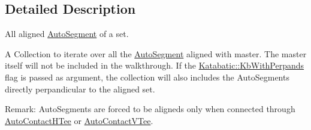 \subsection{Detailed Description}
All aligned \hyperlink{classKatabatic_1_1AutoSegment}{Auto\-Segment} of a set. 

A Collection to iterate over all the \hyperlink{classKatabatic_1_1AutoSegment}{Auto\-Segment} aligned with {\ttfamily master}. The {\ttfamily master} itself will not be included in the walkthrough. If the \hyperlink{namespaceKatabatic_a2af2ad6b6441614038caf59d04b3b217ae2d033c8f78b61468c827de8db5fe839}{Katabatic\-::\-Kb\-With\-Perpands} flag is passed as argument, the collection will also includes the Auto\-Segments directly perpandicular to the aligned set.

\begin{DoxyParagraph}{Remark\-:}
Auto\-Segments are forced to be aligneds only when connected through \hyperlink{classKatabatic_1_1AutoContactHTee}{Auto\-Contact\-H\-Tee} or \hyperlink{classKatabatic_1_1AutoContactVTee}{Auto\-Contact\-V\-Tee}. 
\end{DoxyParagraph}


